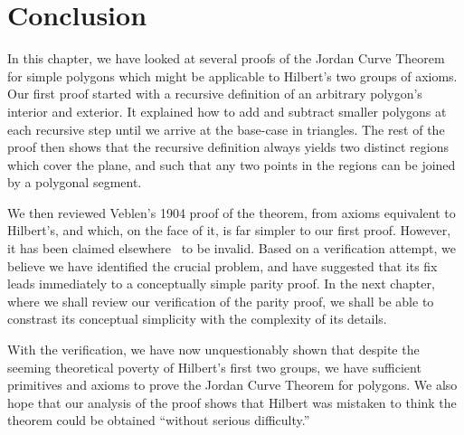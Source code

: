 \section{Conclusion}
In this chapter, we have looked at several proofs of the Jordan Curve Theorem for simple polygons which might be applicable to Hilbert's two groups of axioms. Our first proof started with a recursive definition of an arbitrary polygon's interior and exterior. It explained how to add and subtract smaller polygons at each recursive step until we arrive at the base-case in triangles. The rest of the proof then shows that the recursive definition always yields two distinct regions which cover the plane, and such that any two points in the regions can be joined by a polygonal segment.

We then reviewed Veblen's 1904 proof of the theorem, from axioms equivalent to Hilbert's, and which, on the face of it, is far simpler to our first proof. However, it has been claimed elsewhere~\cite{GuggenheimerJordanCurve,HahnInconclusiveIndirect} to be invalid. Based on a verification attempt, we believe we have identified the crucial problem, and have suggested that its fix leads immediately to a conceptually simple parity proof. In the next chapter, where we shall review our verification of the parity proof, we shall be able to constrast its conceptual simplicity with the complexity of its details. 

With the verification, we have now unquestionably shown that despite the seeming theoretical poverty of Hilbert's first two groups, we have sufficient primitives and axioms to prove the Jordan Curve Theorem for polygons. We also hope that our analysis of the proof shows that Hilbert was mistaken to think the theorem could be obtained ``without serious difficulty.''

